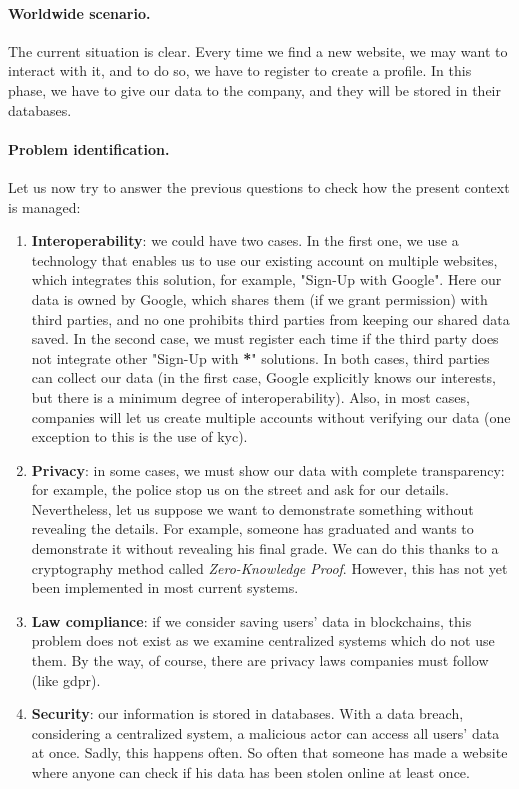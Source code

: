 \paragraph{Worldwide scenario.} The current situation is clear. Every time we 
find a new website, we may want to interact with it, and to do so, we 
have to register to create a profile. In this phase, we have to give our data to 
the company, and they will be stored in their databases.

\paragraph{Problem identification.} Let us now try to answer the previous questions 
to check how the present context is managed:
\begin{enumerate}
    \item \textbf{Interoperability}: we could have two cases. In the first one, 
    we use a technology that enables us to use our existing account on 
    multiple websites, which integrates this solution, for example, "Sign-Up 
    with Google". Here our data is owned by Google, which shares them (if we 
    grant permission) with third parties, and no one prohibits third parties 
    from keeping our shared data saved. In the second case, we must register 
    each time if the third party does not integrate other "Sign-Up with \textbf{*}" 
    solutions. In both cases, third parties can collect our data (in the 
    first case, Google explicitly knows our interests, but there is a minimum
    degree of interoperability). Also, in most cases, companies will let us 
    create multiple accounts without verifying our data (one exception to 
    this is the use of \acrshort{kyc}).
    \item \textbf{Privacy}: in some cases, we must show our data
    with complete transparency: for example, the police stop us on the 
    street and ask for our details. Nevertheless, let us suppose we want to 
    demonstrate something without revealing the details. For example, 
    someone has graduated and wants to demonstrate it without revealing 
    his final grade. We can do this thanks to a cryptography method 
    called \textit{Zero-Knowledge Proof}\cite{article:zkp}. However, this has not yet been
    implemented in most current systems.
    \item \textbf{Law compliance}: if we consider saving users' data in 
    blockchains, this problem does not exist as we examine centralized 
    systems which do not use them. By the way, of course, there are privacy 
    laws companies must follow (like \acrshort{gdpr}).
    \item \textbf{Security}: our information is stored in databases. With 
    a data breach, considering a centralized system, a malicious actor can 
    access all users' data at once. Sadly, this happens often. So often 
    that someone has made a website where anyone can check if his data has 
    been stolen online at least once\cite{site:pwned}.
\end{enumerate}

